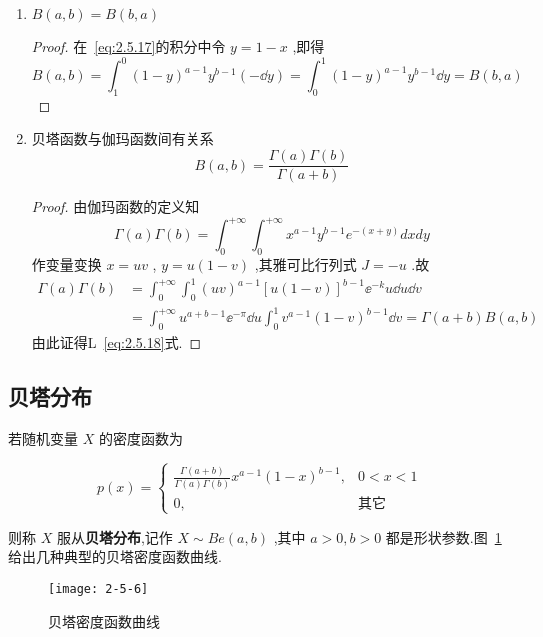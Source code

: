 \begin{enumerate}
	\item $ B(a, b)=B(b, a) $ 
	\begin{proof}
		在~\ref{eq:2.5.17}的积分中令 $ y=1-x $ ,即得
		\[
		B(a, b)=\int_{1}^{0}(1-y)^{a-1} y^{b-1}(-\dd y)=\int_{0}^{1}(1-y)^{a-1} y^{b-1} \dd y=B(b, a)
		\]
	\end{proof}
	\item 贝塔函数与伽玛函数间有关系
	\begin{equation}
	B(a, b)=\frac{\Gamma(a) \Gamma(b)}{\Gamma(a+b)} \label{eq:2.5.18}
	\end{equation}
	\begin{proof}
		由伽玛函数的定义知
		\[
		\Gamma(a) \Gamma(b)=\int_{0}^{+\infty} \int_{0}^{+\infty} x^{a-1} y^{b-1} e^{-(x+y)} d x d y
		\]
		作变量变换 $ x=uv $ , $ y=u(1-v) $ ,其雅可比行列式 $ J=-u $ .故
		\[
		\begin{aligned} \Gamma(a) \Gamma(b) &=\int_{0}^{+\infty} \int_{0}^{1}(u v)^{a-1}[u(1-v)]^{b-1} \ee ^{-k} u \dd u \dd v \\ &=\int_{0}^{+\infty} u^{a+b-1} \ee ^{-\pi} \dd u \int_{0}^{1} v^{a-1}(1-v)^{b-1} \dd v=\Gamma(a+b) B(a, b) \end{aligned}
		\]
		由此证得L~\ref{eq:2.5.18}式.
	\end{proof}
\end{enumerate}

\subsection{贝塔分布}\label{ssec:2.5.6}

若随机变量 $ X $ 的密度函数为

\begin{equation}
p(x)=\left\{\begin{array}{ll}
{\frac{\Gamma(a+b)}{\Gamma(a) \Gamma(b)} x^{a-1}(1-x)^{b-1},} & { 0<x<1}\\ 
{0,} & {\text{其它}}
\end{array}
\right. \label{eq:2.5.19}
\end{equation}

则称 $ X $ 服从\textbf{贝塔分布},记作 $ X \sim B e(a, b) $ ,其中 $ a>0,b>0 $ 都是形状参数.图~\ref{fig:2.5.6}给出几种典型的贝塔密度函数曲线.

\begin{figure}
	\centering
	\texttt{[image: 2-5-6]}
	\caption{贝塔密度函数曲线}
	\label{fig:2.5.6}
\end{figure}

